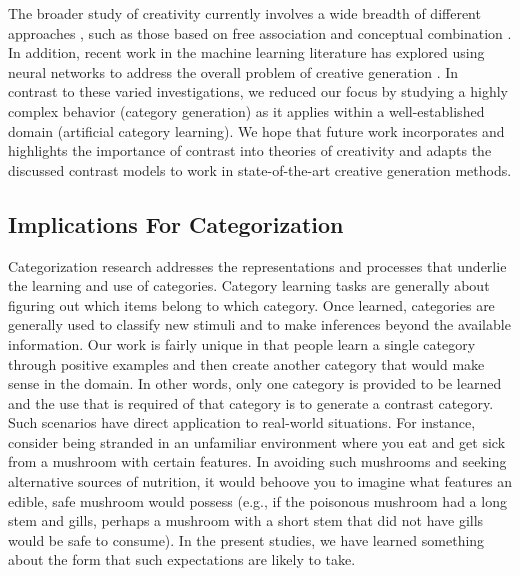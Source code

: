 \documentclass[12pt]{article}
\begin{document}
\begin{flushleft}
The broader study of creativity currently involves a wide breadth of different
approaches \citep[for a review, see][]{kozbelt2010theories}, such as those based
on free association \citep{mednick1962associative} and conceptual combination
\citep{estes2002emergence,murphy1988comprehending}. In addition, recent work in
the machine learning literature has explored using neural networks to address
the overall problem of creative generation
\citep[e.g.,][]{goodfellow2014gan,ho2016gail,kingma2016,chen2016infogan}. In
contrast to these varied investigations, we reduced our focus by studying a
highly complex behavior (category generation) as it applies within a
well-established domain (artificial category learning). We hope that future work
incorporates and highlights the importance of contrast into theories of
creativity and adapts the discussed contrast models to work in state-of-the-art creative generation methods.

\subsection{Implications For Categorization}

Categorization research addresses the representations and processes that
underlie the learning and use of categories. Category learning tasks are
generally about figuring out which items belong to which category. Once learned,
categories are generally used to classify new stimuli and to make inferences
beyond the available information. Our work is fairly unique in that people learn
a single category through positive examples and then create another category
that would make sense in the domain. In other words, only one category is
provided to be learned and the use that is required of that category is to
generate a contrast category. Such scenarios have direct application to
real-world situations. For instance, consider being stranded in an unfamiliar
environment where you eat and get sick from a mushroom with certain features. In
avoiding such mushrooms and seeking alternative sources of nutrition, it would
behoove you to imagine what features an edible, safe mushroom would possess (e.g.,
if the poisonous mushroom had a long stem and gills, perhaps a mushroom with a short stem that did not have gills would be safe to
consume). In the present studies, we have learned something about the form that
such expectations are likely to take. 


\end{flushleft}
\end{document}
